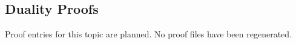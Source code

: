 \subsection*{Duality Proofs}

Proof entries for this topic are planned. No proof files have been regenerated.
